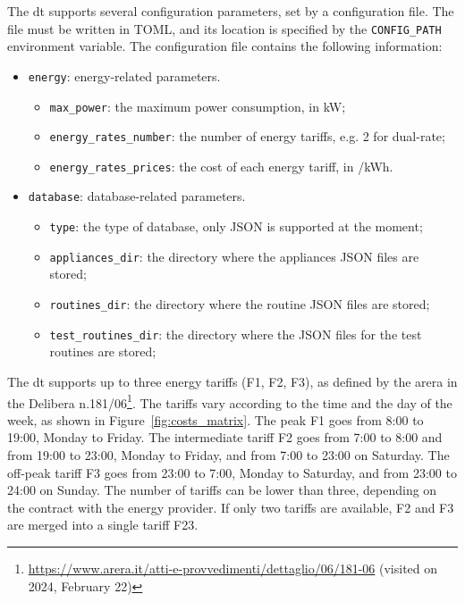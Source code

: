 The \acrshort{dt} supports several configuration parameters, set by a configuration file. The file must be written in TOML, and its location is specified by the \texttt{CONFIG\_PATH} environment variable. The configuration file contains the following information:
\begin{itemize}
    \item \texttt{energy}: energy-related parameters.
          \begin{itemize}
              \item \texttt{max\_power}: the maximum power consumption, in kW;
              \item \texttt{energy\_rates\_number}: the number of energy tariffs, e.g. 2 for dual-rate;
              \item \texttt{energy\_rates\_prices}: the cost of each energy tariff, in \texteuro/kWh.
          \end{itemize}
    \item \texttt{database}: database-related parameters.
          \begin{itemize}
              \item \texttt{type}: the type of database, only JSON is supported at the moment;
              \item \texttt{appliances\_dir}: the directory where the appliances JSON files are stored;
              \item \texttt{routines\_dir}: the directory where the routine JSON files are stored;
              \item \texttt{test\_routines\_dir}: the directory where the JSON files for the test routines are stored;
          \end{itemize}
\end{itemize}

The \acrshort{dt} supports up to three energy tariffs (F1, F2, F3), as defined by the \acrfull{arera} in the Delibera n.181/06\footnote{\url{https://www.arera.it/atti-e-provvedimenti/dettaglio/06/181-06} (visited on 2024, February 22)}. The tariffs vary according to the time and the day of the week, as shown in Figure~\ref{fig:costs_matrix}. The peak F1 goes from 8:00 to 19:00, Monday to Friday. The intermediate tariff F2 goes from 7:00 to 8:00 and from 19:00 to 23:00, Monday to Friday, and from 7:00 to 23:00 on Saturday. The off-peak tariff F3 goes from 23:00 to 7:00, Monday to Saturday, and from 23:00 to 24:00 on Sunday. The number of tariffs can be lower than three, depending on the contract with the energy provider. If only two tariffs are available, F2 and F3 are merged into a single tariff F23.

